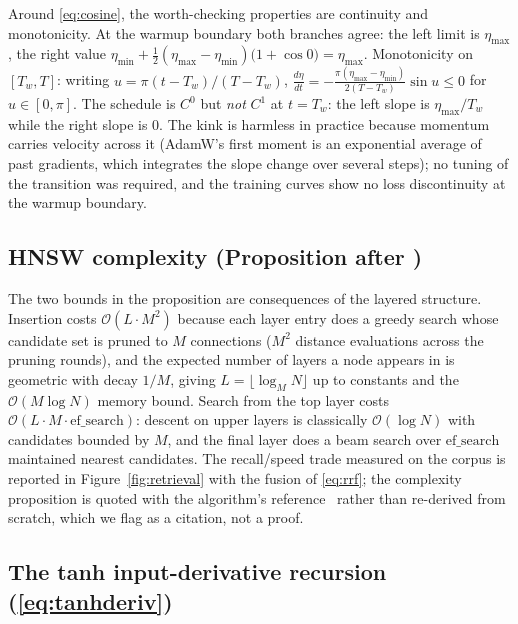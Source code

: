 \documentclass[11pt,a4paper]{article}
\theoremstyle{plain}
\theoremstyle{definition}
\begin{document}
Around \eqref{eq:cosine}, the worth-checking properties are continuity and
monotonicity. At the warmup boundary both branches agree: the left
limit is $\eta_{\max}$, the right value
$\eta_{\min}+\frac12(\eta_{\max}-\eta_{\min})\bigl(1+\cos 0\bigr)
=\eta_{\max}$. Monotonicity on $[T_w,T]$: writing $u=\pi(t-T_w)/(T-T_w)$,
$\frac{d\eta}{dt}=-\frac{\pi(\eta_{\max}-\eta_{\min})}{2(T-T_w)}\sin u\le0$
for $u\in[0,\pi]$. The schedule is $C^0$ but \emph{not} $C^1$ at $t=T_w$:
the left slope is $\eta_{\max}/T_w$ while the right slope is $0$. The
kink is harmless in practice because momentum carries velocity across it
(AdamW's first moment is an exponential average of past gradients, which
integrates the slope change over several steps); no tuning of the
transition was required, and the training curves show no loss discontinuity
at the warmup boundary.

\subsection{HNSW complexity (Proposition after \cite{malkov2018hnsw})}
\label{app:hnsw}

The two bounds in the proposition are consequences of the layered
structure. Insertion costs $\mathcal{O}(L\cdot M^2)$ because each layer
entry does a greedy search whose candidate set is pruned to $M$
 connections ($M^2$ distance evaluations across the pruning rounds), and
the expected number of layers a node appears in is geometric with decay
$1/M$, giving $L=\lfloor\log_M N\rfloor$ up to constants and the
$\mathcal{O}(M\log N)$ memory bound. Search from the top layer costs
$\mathcal{O}(L\cdot M\cdot \mathrm{ef\_search})$: descent on upper layers
is classically $\mathcal{O}(\log N)$ with candidates bounded by $M$, and
the final layer does a beam search over $\mathrm{ef\_search}$ maintained
nearest candidates. The recall/speed trade measured on the corpus is
reported in Figure~\ref{fig:retrieval} with the fusion of \eqref{eq:rrf};
the complexity proposition is quoted with the algorithm's
reference~\cite{malkov2018hnsw} rather than re-derived from scratch,
which we flag as a citation, not a proof.

\subsection{The tanh input-derivative recursion \texorpdfstring{(\eqref{eq:tanhderiv})}{}}
\label{app:tanhderiv}
\end{document}
